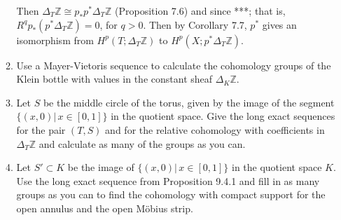 \documentclass{article}
\newcommand{\zed}{\mathbb Z}
\begin{document}
\begin{enumerate}
\begin{enumerate}
Then $\Delta_T\mathbb{Z} \cong p_*p^*\Delta_T\mathbb{Z}$ (Proposition 7.6) and since ***; that is, $R^qp_*(p^*\Delta_T\mathbb{Z}) = 0$, for $q >0$. Then by Corollary 7.7, $p^*$ gives an isomorphism from $H^p(T; \Delta_T\mathbb{Z})$ to $H^p(X; p^*\Delta_T\mathbb{Z})$.
\item Use a Mayer-Vietoris sequence to calculate the cohomology groups of the Klein bottle with values in the constant sheaf $\Delta_K\zed$. 
\item
Let $S$ be the middle circle of the torus, given by the image of the segment $\{(x,0)|\,x\in[0,1]\}$ in the quotient space. Give the long exact sequences for the pair $(T,S)$ 
and for the relative cohomology with coefficients in $\Delta_T\zed$ and calculate as many of the groups as you can.
\item
Let $S'\subset K$ be the image of $\{(x,0)|\,x\in[0,1]\}$ in the quotient space $K$.
Use the long exact sequence from Proposition 9.4.1 and fill in as many groups as you can to find the cohomology with compact support for 
the open annulus and the open M\"obius strip.
\end{enumerate}


\end{enumerate}
\end{document}
